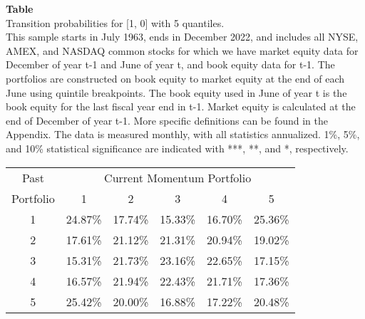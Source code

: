 \begin{table*}[ht!]
\raggedright
{}
\label{tab: transition_probs_[1, 0]_with_5_quantiles}
\textbf{Table \thetable} \\
Transition probabilities for [1, 0] with 5 quantiles. \\
\hspace*{1em}This sample starts in July 1963, ends in December 2022, and includes all NYSE, AMEX, and NASDAQ common stocks for which we have market equity data for December of year t-1 and June of year t, and book equity data for t-1. The portfolios are constructed on book equity to market equity at the end of each June using quintile breakpoints.  The book equity used in June of year t is the book equity for the last fiscal year end in t-1.  Market equity is calculated at the end of December of year t-1.  More specific definitions can be found in the Appendix.  The data is measured monthly, with all statistics annualized.  1\%, 5\%, and 10\% statistical significance are indicated with ***, **, and *, respectively. \\
\vspace{0.5em}
\centering
\begin{adjustbox}{max width=\textwidth}
\begin{tabular}{@{}cccccc@{}}
\toprule
Past & \multicolumn{5}{c}{Current Momentum Portfolio} \\
Portfolio & 1 & 2 & 3 & 4 & 5 \\
\midrule
1 & 24.87\% & 17.74\% & 15.33\% & 16.70\% & 25.36\% \\
2 & 17.61\% & 21.12\% & 21.31\% & 20.94\% & 19.02\% \\
3 & 15.31\% & 21.73\% & 23.16\% & 22.65\% & 17.15\% \\
4 & 16.57\% & 21.94\% & 22.43\% & 21.71\% & 17.36\% \\
5 & 25.42\% & 20.00\% & 16.88\% & 17.22\% & 20.48\% \\
\bottomrule
\end{tabular}
\end{adjustbox}
\end{table*}